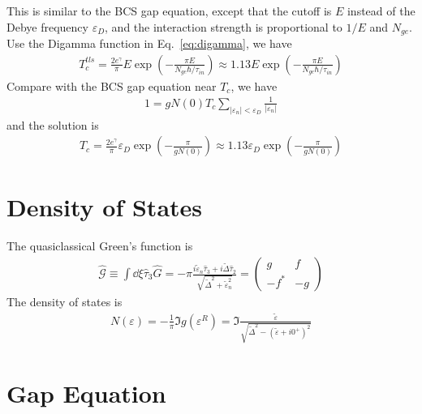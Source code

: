 \documentclass[]{article}
\begin{document}
This is similar to the BCS gap equation, except that the cutoff is $E$ instead of
the Debye frequency $\varepsilon_D$, and the interaction strength is proportional to
$1/E$ and $N_{ge}$. Use the Digamma function in Eq.~\eqref{eq:digamma}, we have
\begin{align}
    T_c^{tls} = \frac{2e^\gamma}{\pi}E\exp\left(-\frac{\pi E}{N_{ge}\hbar/\tau_{in}}\right)
    \approx 1.13E\exp\left(-\frac{\pi E}{N_{ge}\hbar/\tau_{in}}\right)
\end{align}
Compare with the BCS gap equation near $T_c$, we have
\begin{align}
    1 = gN(0)T_c\sum_{|\varepsilon_n| < \varepsilon_D}\frac{1}{|\varepsilon_n|}
\end{align}
and the solution is
\begin{align}
    T_c = \frac{2e^\gamma}{\pi}\varepsilon_D\exp\left(-\frac{\pi}{gN(0)}\right)
    \approx 1.13\varepsilon_D\exp\left(-\frac{\pi}{gN(0)}\right)
\end{align}

\section{Density of States}

The quasiclassical Green's function is
\begin{align}
    \widehat{\mathcal{G}} \equiv \int\dd\xi\widehat{\tau}_3\widehat{G}
    =-\pi\frac{i\tilde{\varepsilon}_n\widehat{\tau}_3 + i\tilde{\Delta}\widehat{\tau}_2}
    {\sqrt{\tilde{\Delta}^2 + \tilde{\varepsilon}_n^2}}
    =\begin{pmatrix}
         g    & f  \\
         -f^* & -g
     \end{pmatrix}
\end{align}
The density of states is
\begin{align}
    N(\varepsilon) = -\frac{1}{\pi}\Im{g(\varepsilon^R)}
    = \Im{\frac{\tilde{\varepsilon}}{\sqrt{\tilde{\Delta}^2 - (\tilde{\varepsilon} + i0^+)^2}}}
\end{align}

\section{Gap Equation}
\end{document}
